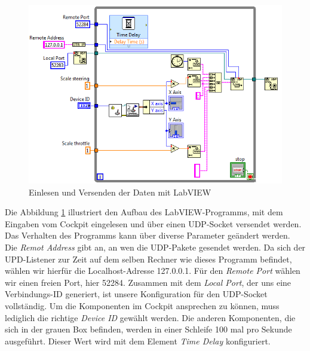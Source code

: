 \newpage 

\begin{figure}[H]
\centering 
\includegraphics[width=1\linewidth]{src/labview_screenshot_videoplayer_daten_senden.png}
\caption{Einlesen und Versenden der Daten mit LabVIEW} %
\label{labview_screenshot_videoplayer_daten_senden} %
\end{figure}
Die Abbildung \ref{labview_screenshot_videoplayer_daten_senden} illustriert den Aufbau des LabVIEW-Programms, mit dem Eingaben vom Cockpit eingelesen und über einen UDP-Socket versendet werden. Das Verhalten des Programms kann über diverse Parameter geändert werden.\\
Die \textit{Remot Address} gibt an, an wen die UDP-Pakete gesendet werden. Da sich der UPD-Listener zur Zeit auf dem selben Rechner wie dieses Programm befindet, wählen wir hierfür die Localhost-Adresse 127.0.0.1. Für den \textit{Remote Port} wählen wir einen freien Port, hier 52284. Zusammen mit dem \textit{Local Port}, der uns eine Verbindungs-ID generiert, ist unsere Konfiguration für den UDP-Socket vollständig. Um die Komponenten im Cockpit ansprechen zu können, muss lediglich die richtige \textit{Device ID} gewählt werden. Die anderen Komponenten, die sich in der grauen Box befinden, werden in einer Schleife 100 mal pro Sekunde ausgeführt. Dieser Wert wird mit dem Element \textit{Time Delay} konfiguriert.\\
